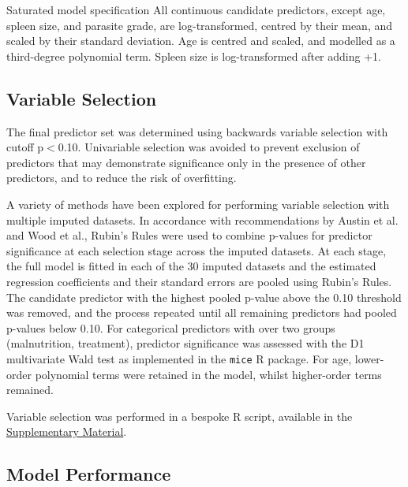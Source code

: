 \begin{mybox}[floatplacement=tb, label=box:mod-spec]{Saturated model specification}
  \vspace{0.3cm}
  All continuous candidate predictors, except age, spleen size, and parasite grade, are log-transformed, centred by their mean, and scaled by their standard deviation. Age is centred and scaled, and modelled as a third-degree polynomial term. Spleen size is log-transformed after adding +1.
\end{mybox}

\subsection{\label{sec:meth-vs}Variable Selection}

The final predictor set was determined using backwards variable selection with cutoff p$<$0.10. Univariable selection was avoided to prevent exclusion of predictors that may demonstrate significance only in the presence of other predictors, and to reduce the risk of overfitting\cite{moons2019}.

A variety of methods have been explored for performing variable selection with multiple imputed datasets\cite{austin2019,wood2008}. In accordance with recommendations by Austin et al. and Wood et al., Rubin's Rules were used to combine p-values for predictor significance at each selection stage across the imputed datasets. At each stage, the full model is fitted in each of the 30 imputed datasets and the estimated regression coefficients and their standard errors are pooled using Rubin's Rules. The candidate predictor with the highest pooled p-value above the 0.10 threshold was removed, and the process repeated until all remaining predictors had pooled p-values below 0.10\cite{austin2019,wood2008,rubin1987}. For categorical predictors with over two groups (malnutrition, treatment), predictor significance was assessed with the D1 multivariate Wald test as implemented in the \texttt{mice} R package\cite{van-buuren2011,li1991}. For age, lower-order polynomial terms were retained in the model, whilst higher-order terms remained.

Variable selection was performed in a bespoke R script, available in the \href{https://github.com/jpwil/dphil}{Supplementary Material}.

\subsection{\label{sec:meth-perf}Model Performance}


